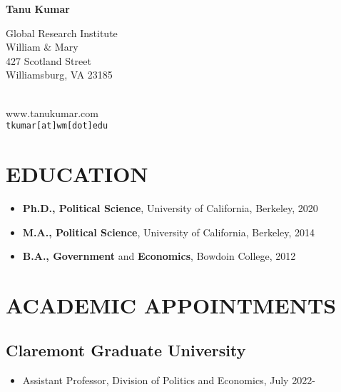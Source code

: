 \documentclass[10pt]{article}
\begin{document}
\thispagestyle{empty}
\begin{center}
\textbf{\Huge{Tanu Kumar}}
\end{center}

\begin{minipage}[t]{0.5\textwidth}
Global Research Institute\\
William \& Mary\\
427 Scotland Street\\
Williamsburg, VA 23185\\ \\
\end{minipage}
\begin{minipage}[t]{0.5\textwidth}
\begin{flushright}
www.tanukumar.com\\
\texttt{tkumar[at]wm[dot]edu}
\end{flushright}\end{minipage}


\section*{EDUCATION}

	\begin{itemize}[nosep]
		\item[] \textbf{Ph.D., Political Science}, University of California, Berkeley, 2020


	\item[]  \textbf{M.A., Political Science}, University of California, Berkeley, 2014
	\item[] \textbf{B.A., Government} and \textbf{Economics}, Bowdoin College, 2012

\end{itemize}

	
\vspace{3mm}

\section*{ACADEMIC APPOINTMENTS}
\subsection*{Claremont Graduate University}
	\begin{itemize}[nosep]
		\item[] Assistant Professor, Division of Politics and Economics, July 2022-	


	
\end{itemize}	
\end{document}
